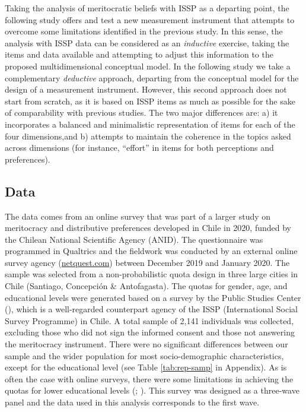 \documentclass[
  10pt,
  a4paper,
]{article}
\begin{document}
Taking the analysis of meritocratic beliefs with ISSP as a departing point, the following study offers and test a new measurement instrument that attempts to overcome some limitations identified in the previous study. In this sense, the analysis with ISSP data can be considered as an \emph{inductive} exercise, taking the items and data available and attempting to adjust this information to the proposed multidimensional conceptual model. In the following study we take a complementary \emph{deductive} approach, departing from the conceptual model for the design of a measurement instrument. However, this second approach does not start from scratch, as it is based on ISSP items as much as possible for the sake of comparability with previous studies. The two major differences are: a) it incorporates a balanced and minimalistic representation of items for each of the four dimensions,and b) attempts to maintain the coherence in the topics asked across dimensions (for instance, ``effort'' in items for both perceptions and preferences).

\subsection{Data}\label{data-1}

The data comes from an online survey that was part of a larger study on meritocracy and distributive preferences developed in Chile in 2020, funded by the Chilean National Scientific Agency (ANID). The questionnaire was programmed in Qualtrics and the fieldwork was conducted by an external online survey agency (\href{www.netquest.com}{netquest.com}) between December 2019 and January 2020. The sample was selected from a non-probabilistic quota design in three large cities in Chile (Santiago, Concepción \& Antofagasta). The quotas for gender, age, and educational levels were generated based on a survey by the Public Studies Center (), which is a well-regarded counterpart agency of the ISSP (International Social Survey Programme) in Chile. A total sample of 2,141 individuals was collected, excluding those who did not sign the informed consent and those not answering the meritocracy instrument. There were no significant differences between our sample and the wider population for most socio-demographic characteristics, except for the educational level (see Table \ref{tab:rep-samp} in Appendix). As is often the case with online surveys, there were some limitations in achieving the quotas for lower educational levels (; ). This survey was designed as a three-wave panel and the data used in this analysis corresponds to the first wave.
\end{document}
